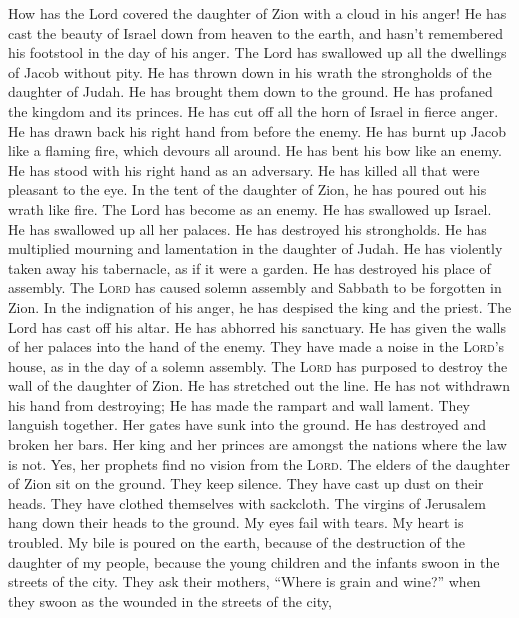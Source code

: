  How has the Lord covered the daughter of Zion with a
cloud in his anger! He has cast the beauty of Israel down from heaven to
the earth, and hasn't remembered his footstool in the day of his anger.
 The Lord has swallowed up all the dwellings of Jacob
without pity. He has thrown down in his wrath the strongholds of the
daughter of Judah. He has brought them down to the ground. He has
profaned the kingdom and its princes.  He has cut off all
the horn of Israel in fierce anger. He has drawn back his right hand
from before the enemy. He has burnt up Jacob like a flaming fire, which
devours all around.  He has bent his bow like an enemy. He
has stood with his right hand as an adversary. He has killed all that
were pleasant to the eye. In the tent of the daughter of Zion, he has
poured out his wrath like fire.  The Lord has become as an
enemy. He has swallowed up Israel. He has swallowed up all her palaces.
He has destroyed his strongholds. He has multiplied mourning and
lamentation in the daughter of Judah.  He has violently
taken away his tabernacle, as if it were a garden. He has destroyed his
place of assembly. The \textsc{Lord} has caused solemn assembly and
Sabbath to be forgotten in Zion. In the indignation of his anger, he has
despised the king and the priest.  The Lord has cast off
his altar. He has abhorred his sanctuary. He has given the walls of her
palaces into the hand of the enemy. They have made a noise in the
\textsc{Lord}'s house, as in the day of a solemn assembly.
 The \textsc{Lord} has purposed to destroy the wall of the
daughter of Zion. He has stretched out the line. He has not withdrawn
his hand from destroying; He has made the rampart and wall lament. They
languish together.  Her gates have sunk into the ground.
He has destroyed and broken her bars. Her king and her princes are
amongst the nations where the law is not. Yes, her prophets find no
vision from the \textsc{Lord}.  The elders of the
daughter of Zion sit on the ground. They keep silence. They have cast up
dust on their heads. They have clothed themselves with sackcloth. The
virgins of Jerusalem hang down their heads to the ground.
 My eyes fail with tears. My heart is troubled. My bile
is poured on the earth, because of the destruction of the daughter of my
people, because the young children and the infants swoon in the streets
of the city.  They ask their mothers, ``Where is grain
and wine?'' when they swoon as the wounded in the streets of the city,
